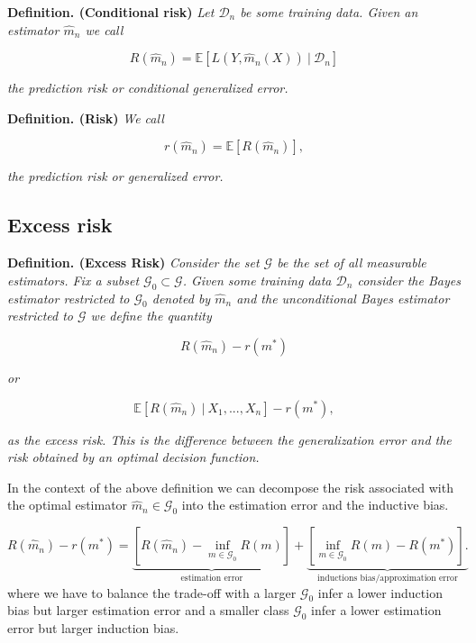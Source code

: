 \documentclass[
]{book}
\begin{document}
\textbf{Definition. (Conditional risk)} \emph{Let \(\mathcal{D}_n\) be some training data. Given an estimator \(\hat{m}_n\) we call}

\[
R(\hat{m}_n)=\mathbb{E}[L(Y,\hat{m}_n(X))\ \vert\ \mathcal{D}_n]
\]

\emph{the prediction risk or conditional generalized error.}

\textbf{Definition. (Risk)} \emph{We call}

\[
r(\hat{m}_n)=\mathbb{E}[R(\hat{m}_n)],
\]

\emph{the prediction risk or generalized error.}

\hypertarget{excess-risk}{%
\subsection{Excess risk}\label{excess-risk}}

\textbf{Definition. (Excess Risk)} \emph{Consider the set \(\mathcal{G}\) be the set of all measurable estimators. Fix a subset \(\mathcal{G}_0\subset\mathcal{G}\). Given some training data \(\mathcal{D}_n\) consider the Bayes estimator restricted to \(\mathcal{G}_0\) denoted by \(\hat{m}_n\) and the unconditional Bayes estimator restricted to \(\mathcal{G}\) we define the quantity}

\[
R(\hat{m}_n)-r(m^*)
\]

\emph{or}

\[
\mathbb{E}[R(\hat{m}_n)\ \vert\ X_1,...,X_n]-r(m^*),
\]

\emph{as the excess risk. This is the difference between the generalization error and the risk obtained by an optimal decision function.}

In the context of the above definition we can decompose the risk associated with the optimal estimator \(\hat{m}_n\in\mathcal{G}_0\) into the estimation error and the inductive bias.

\[
R(\hat{m}_n)-r(m^*)=\underbrace{\left[R(\hat{m}_n)-\inf_{m\in\mathcal{G}_0}R(m)\right]}_{\text{estimation error}}+\underbrace{\left[\inf_{m\in\mathcal{G}_0}R(m)-R(m^*)\right].}_{\text{inductions bias/approximation error}}
\]
where we have to balance the trade-off with a larger \(\mathcal{G}_0\) infer a lower induction bias but larger estimation error and a smaller class \(\mathcal{G}_0\) infer a lower estimation error but larger induction bias.
\end{document}
